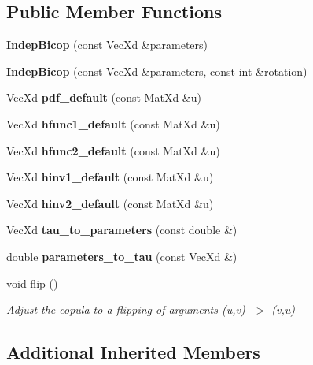 \subsection*{Public Member Functions}
\begin{DoxyCompactItemize}
\item 
\hypertarget{class_indep_bicop_ab9f48d3291ac99c34e33c2f29b133e5d}{{\bfseries Indep\+Bicop} (const Vec\+Xd \&parameters)}\label{class_indep_bicop_ab9f48d3291ac99c34e33c2f29b133e5d}

\item 
\hypertarget{class_indep_bicop_ad7ead44250e4f421ec491b2d2a7eb030}{{\bfseries Indep\+Bicop} (const Vec\+Xd \&parameters, const int \&rotation)}\label{class_indep_bicop_ad7ead44250e4f421ec491b2d2a7eb030}

\item 
\hypertarget{class_indep_bicop_a533aeb27876d38d9836929a71b9bb223}{Vec\+Xd {\bfseries pdf\+\_\+default} (const Mat\+Xd \&u)}\label{class_indep_bicop_a533aeb27876d38d9836929a71b9bb223}

\item 
\hypertarget{class_indep_bicop_abac716dd22bc020d073d50dfc552c00e}{Vec\+Xd {\bfseries hfunc1\+\_\+default} (const Mat\+Xd \&u)}\label{class_indep_bicop_abac716dd22bc020d073d50dfc552c00e}

\item 
\hypertarget{class_indep_bicop_ae054353b15c15d68a02b36a804e54dfa}{Vec\+Xd {\bfseries hfunc2\+\_\+default} (const Mat\+Xd \&u)}\label{class_indep_bicop_ae054353b15c15d68a02b36a804e54dfa}

\item 
\hypertarget{class_indep_bicop_a61e64923f5b5a142d093c5b706893b93}{Vec\+Xd {\bfseries hinv1\+\_\+default} (const Mat\+Xd \&u)}\label{class_indep_bicop_a61e64923f5b5a142d093c5b706893b93}

\item 
\hypertarget{class_indep_bicop_a426311d78e6142d6f57e5a09080f9239}{Vec\+Xd {\bfseries hinv2\+\_\+default} (const Mat\+Xd \&u)}\label{class_indep_bicop_a426311d78e6142d6f57e5a09080f9239}

\item 
\hypertarget{class_indep_bicop_ae2bcd4c9c3fadb947cce3d1915ca6f57}{Vec\+Xd {\bfseries tau\+\_\+to\+\_\+parameters} (const double \&)}\label{class_indep_bicop_ae2bcd4c9c3fadb947cce3d1915ca6f57}

\item 
\hypertarget{class_indep_bicop_a1f9a8f4bf6d0fc6a053ded53eb35015a}{double {\bfseries parameters\+\_\+to\+\_\+tau} (const Vec\+Xd \&)}\label{class_indep_bicop_a1f9a8f4bf6d0fc6a053ded53eb35015a}

\item 
\hypertarget{class_indep_bicop_ab6e5a7670b984d685241b6c998ff3381}{void \hyperlink{class_indep_bicop_ab6e5a7670b984d685241b6c998ff3381}{flip} ()}\label{class_indep_bicop_ab6e5a7670b984d685241b6c998ff3381}

\begin{DoxyCompactList}\small\item\em Adjust the copula to a flipping of arguments (u,v) -\/$>$ (v,u) \end{DoxyCompactList}\end{DoxyCompactItemize}
\subsection*{Additional Inherited Members}
